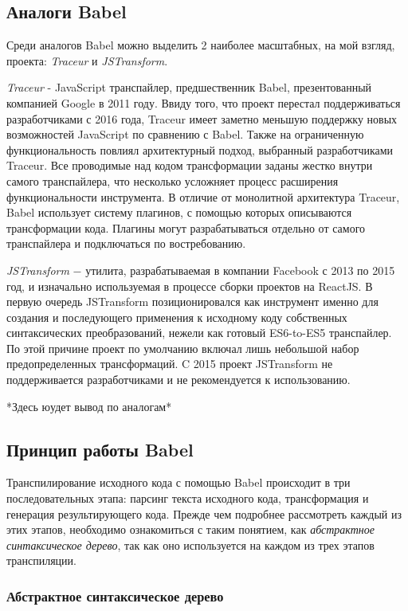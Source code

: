 \documentclass[14pt, a4paper]{article}
\begin{document}
\subsection{Аналоги Babel}
Среди аналогов Babel можно выделить 2 наиболее масштабных, на мой взгляд, проекта: 
\textit{Traceur} и \textit{JSTransform}.

\textit{Traceur} \cite{traceur} - JavaScript транспайлер, предшественник Babel, презентованный компанией Google в 2011 году. 
Ввиду того, что проект перестал поддерживаться разработчиками с 2016 года, Traceur имеет заметно 
меньшую поддержку новых возможностей JavaScript по сравнению с Babel. Также на ограниченную 
функциональность повлиял архитектурный подход, выбранный разработчиками Traceur. Все проводимые над 
кодом трансформации заданы жестко внутри самого транспайлера, что несколько усложняет процесс расширения 
функциональности инструмента. В отличие от монолитной архитектура Traceur, Babel использует систему 
плагинов, с помощью которых описываются трансформации кода. Плагины могут разрабатываться отдельно 
от самого транспайлера и подключаться по востребованию.

\textit{JSTransform} \cite{jstransform} $-$ утилита, разрабатываемая в компании Facebook с 2013 по 2015 год, и изначально используемая 
в процессе сборки проектов на ReactJS. В первую очередь JSTransform позиционировался как
инструмент именно для создания и последующего применения к исходному коду собственных синтаксических преобразований, 
нежели как готовый ES6-to-ES5 транспайлер. По этой причине проект по умолчанию включал лишь небольшой 
набор предопределенных трансформаций. C 2015 проект JSTransform не поддерживается разработчиками и 
не рекомендуется к использованию.

*Здесь юудет вывод по аналогам*

\subsection{Принцип работы Babel}

Транспилирование исходного кода с помощью Babel происходит в три последовательных этапа: парсинг текста 
исходного кода, трансформация и генерация результирующего кода. Прежде чем подробнее рассмотреть каждый из 
этих этапов, необходимо ознакомиться с таким понятием, как \textit{абстрактное синтаксическое дерево}, 
так как оно используется на каждом из трех этапов транспиляции.

\subsubsection{Абстрактное синтаксическое дерево}
\end{document}
